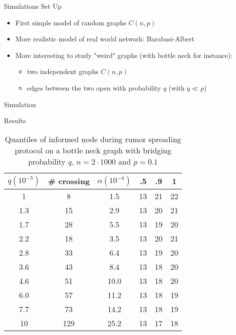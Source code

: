 \documentclass{beamer}
\begin{document}
\frame{\sectionpage}

\begin{frame}{Simulations Set Up}
\begin{itemize}
  \item 
    First simple model of random graphs $C(n,p)$

  \item
    More realistic model of real world network: Barabasi-Albert
  \item More interesting to study "weird" graphs (with bottle neck for instance): 
  \begin{itemize}
    \item two independent graphs $C(n,p)$
    \item edges between the two open with probability $q$ (with $q\ll p$)
  \end{itemize}
\end{itemize}

\end{frame}

\begin{frame}{Simulation}
  
\end{frame}

\begin{frame}{Results}
  \begin{table}
\centering
\begin{tabular}{c|c|c||c|c|c}
  $q (10^{-5})$ & \# crossing & $\alpha (10^{-4})$ & .5 & .9 & 1\\
  \hline
  1 & 8 & 1.5 & 13 & 21 & 22 \\
1.3 & 15 & 2.9 & 13 & 20 & 21 \\
1.7 & 28 & 5.5 & 13 & 19 & 20 \\
2.2 & 18 & 3.5 & 13 & 20 & 21 \\
2.8 & 33 & 6.4 & 13 & 19 & 20 \\
3.6 & 43 & 8.4 & 13 & 18 & 20 \\
4.6 & 51 & 10.0 & 13 & 18 & 20 \\
6.0 & 57 & 11.2 & 13 & 18 & 19 \\
7.7 & 73 & 14.2 & 13 & 18 & 19 \\
10 & 129 & 25.2 & 13 & 17 & 18 \\
\end{tabular}
\caption{Quantiles of informed node during rumor spreading protocol on a bottle neck graph with bridging probability $q$, $n = 2 \cdot 1000$ and $p = 0.1$}
\label{tab:quantiles}
\end{table}
\end{frame}
\end{document}
